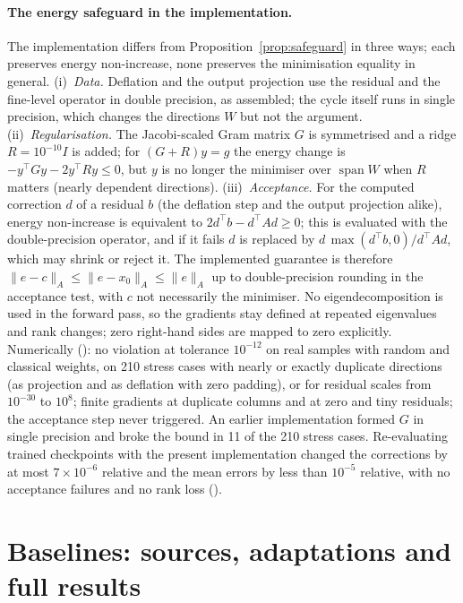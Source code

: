 \paragraph{The energy safeguard in the implementation.} The implementation differs from Proposition~\ref{prop:safeguard} in
three ways; each preserves energy non-increase, none preserves the minimisation equality in general. (i)~\emph{Data.}
Deflation and the output projection use the residual and the fine-level operator in double precision, as assembled; the
cycle itself runs in single precision, which changes the directions $W$ but not the argument. (ii)~\emph{Regularisation.} The
Jacobi-scaled Gram matrix $G$ is symmetrised and a ridge $R = 10^{-10}I$ is added; for $(G+R)y = g$ the energy change is
$-y^\top Gy - 2y^\top Ry\le 0$, but $y$ is no longer the minimiser over $\operatorname{span}W$ when $R$ matters (nearly
dependent directions). (iii)~\emph{Acceptance.} For the computed correction $d$ of a residual $b$ (the deflation step and the
output projection alike), energy non-increase is equivalent to $2d^\top b - d^\top A d\ge 0$; this is evaluated with the
double-precision operator, and if it fails $d$ is replaced by $d\,\max(d^\top b,0)/d^\top Ad$, which may shrink or reject it.
The implemented guarantee is therefore $\|e-c\|_A\le\|e - x_0\|_A\le\|e\|_A$ up to double-precision rounding in the acceptance
test, with $c$ not necessarily the minimiser. No eigendecomposition is used in the forward pass, so the gradients stay defined
at repeated eigenvalues and rank changes; zero right-hand sides are mapped to zero explicitly. Numerically
(): no violation at tolerance $10^{-12}$ on real samples with random and
classical weights, on 210 stress cases with nearly or exactly duplicate directions (as projection and as deflation with zero
padding), or for residual scales from $10^{-30}$ to $10^{8}$; finite gradients at duplicate columns and at zero and tiny
residuals; the acceptance step never triggered. An earlier implementation formed $G$ in single precision and broke the bound in
11 of the 210 stress cases. Re-evaluating trained checkpoints with the present implementation changed the corrections by at most
$7\times10^{-6}$ relative and the mean errors by less than $10^{-5}$ relative, with no acceptance failures and no rank loss
().

\section{Baselines: sources, adaptations and full results}\label{app:baselines}

